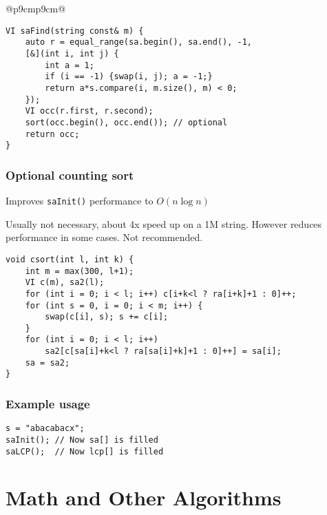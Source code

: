 \documentclass[letterpaper]{article}
\begin{document}
\begin{tabular}{@{}p{9cm}p{9cm}@{}}
    \begin{lstlisting}
VI saFind(string const& m) {
	auto r = equal_range(sa.begin(), sa.end(), -1,
	[&](int i, int j) {
		int a = 1;
		if (i == -1) {swap(i, j); a = -1;}
		return a*s.compare(i, m.size(), m) < 0;
	});
	VI occ(r.first, r.second);
	sort(occ.begin(), occ.end()); // optional
	return occ;
}
\end{lstlisting}
    \subsubsection{Optional counting sort}
    Improves \texttt{saInit()} performance to $O\left(n\log n\right)$

    Usually not necessary, about 4x speed up on a 1M string. However reduces performance in some cases. Not recommended.
    \begin{lstlisting}
void csort(int l, int k) {
	int m = max(300, l+1);
	VI c(m), sa2(l);
	for (int i = 0; i < l; i++) c[i+k<l ? ra[i+k]+1 : 0]++;
	for (int s = 0, i = 0; i < m; i++) {
		swap(c[i], s); s += c[i];
	}
	for (int i = 0; i < l; i++)
		sa2[c[sa[i]+k<l ? ra[sa[i]+k]+1 : 0]++] = sa[i];
	sa = sa2;
}
\end{lstlisting}
    \subsubsection{Example usage}

    \begin{lstlisting}
s = "abacabacx";
saInit(); // Now sa[] is filled
saLCP();  // Now lcp[] is filled
\end{lstlisting}
\end{tabular}

\clearpage

\section{Math and Other Algorithms}
\end{document}
